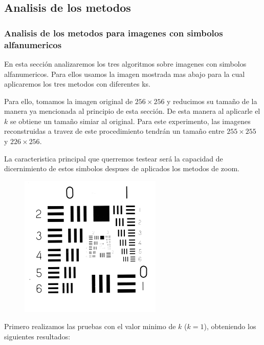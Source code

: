 \subsection{Analisis de los metodos}
\subsubsection{Analisis de los metodos para imagenes con simbolos alfanumericos}
En esta sección analizaremos los tres algoritmos sobre imagenes con simbolos alfanumericos. Para ellos usamos la imagen mostrada mas abajo para la cual aplicaremos los tres metodos con diferentes ks.

Para ello, tomamos la imagen original de $256 \times 256$ y reducimos su tamaño de la manera ya mencionada al principio de esta sección. De esta manera al aplicarle el $k$ se obtiene un tamaño simiar al original. Para este experimento, las imagenes reconstruidas a travez de este procedimiento tendrán un tamaño entre $255 \times 255$ y $226 \times 256$.

La caracteristica principal que querremos testear será la capacidad de dicernimiento de estos simbolos despues de aplicados los metodos de zoom.

\begin{figure}[H]
\centering
\includegraphics[scale=0.50]{fotos/alfanum/orig.png}
\end{figure}

Primero realizamos las pruebas con el valor minimo de $k$ ($k=1$), obteniendo los siguientes resultados:


